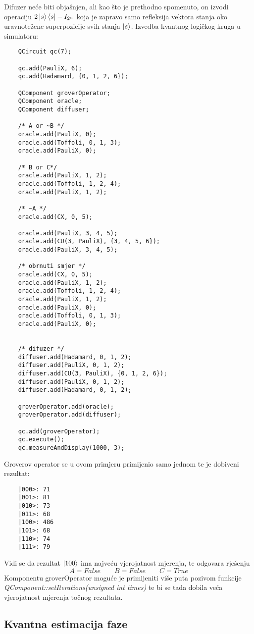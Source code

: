 Difuzer neće biti objašnjen, ali kao što je prethodno spomenuto, on izvodi operaciju $2\ket{s}\bra{s} - I_{2^n}$ koja je zapravo samo refleksija vektora stanja oko uravnotežene superpozicije svih stanja $\ket{s}$.
Izvedba kvantnog logičkog kruga u simulatoru:
\begin{lstlisting}
	QCircuit qc(7);

	qc.add(PauliX, 6);
	qc.add(Hadamard, {0, 1, 2, 6});

	QComponent groverOperator;
	QComponent oracle;
	QComponent diffuser;

	/* A or ~B */
	oracle.add(PauliX, 0);
	oracle.add(Toffoli, 0, 1, 3);
	oracle.add(PauliX, 0);
	
	/* B or C*/
	oracle.add(PauliX, 1, 2);
	oracle.add(Toffoli, 1, 2, 4);
	oracle.add(PauliX, 1, 2);

	/* ~A */
	oracle.add(CX, 0, 5);

	oracle.add(PauliX, 3, 4, 5);
	oracle.add(CU(3, PauliX), {3, 4, 5, 6});
	oracle.add(PauliX, 3, 4, 5);

	/* obrnuti smjer */
	oracle.add(CX, 0, 5);
	oracle.add(PauliX, 1, 2);
	oracle.add(Toffoli, 1, 2, 4);
	oracle.add(PauliX, 1, 2);
	oracle.add(PauliX, 0);
	oracle.add(Toffoli, 0, 1, 3);
	oracle.add(PauliX, 0);
	

	/* difuzer */
	diffuser.add(Hadamard, 0, 1, 2);
	diffuser.add(PauliX, 0, 1, 2);
	diffuser.add(CU(3, PauliX), {0, 1, 2, 6});
	diffuser.add(PauliX, 0, 1, 2);
	diffuser.add(Hadamard, 0, 1, 2);
	
	groverOperator.add(oracle);
	groverOperator.add(diffuser);

	qc.add(groverOperator);
	qc.execute();
	qc.measureAndDisplay(1000, 3);
\end{lstlisting}

Groverov operator se u ovom primjeru primijenio samo jednom te je dobiveni rezultat:
\begin{lstlisting}
	|000>: 71
	|001>: 81
	|010>: 73
	|011>: 68
	|100>: 486
	|101>: 68
	|110>: 74
	|111>: 79
\end{lstlisting}
Vidi se da rezultat $\ket{100}$ ima najveću vjerojatnost mjerenja, te odgovara rješenju
\[
A = False \qquad B = False \qquad C = True
\]
Komponentu groverOperator moguće je primijeniti više puta pozivom funkcije \emph{QComponent::setIterations(unsigned int times)} te bi se tada dobila veća vjerojatnost mjerenja točnog rezultata.

\subsection{Kvantna estimacija faze}

